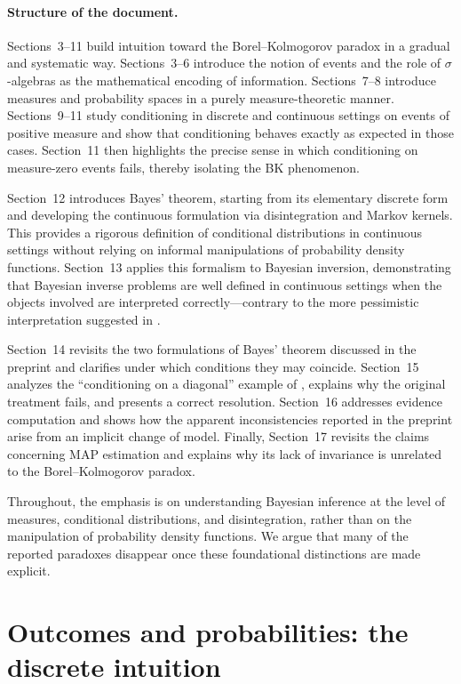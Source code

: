 \documentclass[11pt]{article}
\theoremstyle{remark}
\begin{document}
\paragraph{Structure of the document.}
Sections~3--11 build intuition toward the Borel--Kolmogorov paradox in a gradual
and systematic way. Sections~3--6 introduce the notion of events and the role of
\(\sigma\)-algebras as the mathematical encoding of information. Sections~7--8
introduce measures and probability spaces in a purely measure-theoretic manner.
Sections~9--11 study conditioning in discrete and continuous settings on events
of positive measure and show that conditioning behaves exactly as expected in
those cases. Section~11 then highlights the precise sense in which conditioning
on measure-zero events fails, thereby isolating the BK phenomenon.

Section~12 introduces Bayes' theorem, starting from its elementary discrete form
and developing the continuous formulation via disintegration and Markov kernels.
This provides a rigorous definition of conditional distributions in continuous
settings without relying on informal manipulations of probability density
functions. Section~13 applies this formalism to Bayesian inversion, demonstrating
that Bayesian inverse problems are well defined in continuous settings when the
objects involved are interpreted correctly—contrary to the more pessimistic
interpretation suggested in \citet{MosegaardCurtis2024}.

Section~14 revisits the two formulations of Bayes' theorem discussed in the
preprint and clarifies under which conditions they may coincide.
Section~15 analyzes the ``conditioning on a diagonal'' example of
\citet{MosegaardCurtis2024}, explains why the original treatment fails, and
presents a correct resolution. Section~16 addresses evidence computation and
shows how the apparent inconsistencies reported in the preprint arise from an
implicit change of model. Finally, Section~17 revisits the claims concerning MAP
estimation and explains why its lack of invariance is unrelated to the
Borel--Kolmogorov paradox.

Throughout, the emphasis is on understanding Bayesian inference at the level of
measures, conditional distributions, and disintegration, rather than on the
manipulation of probability density functions. We argue that many of the reported
paradoxes disappear once these foundational distinctions are made explicit.


\section{Outcomes and probabilities: the discrete intuition}
\end{document}
